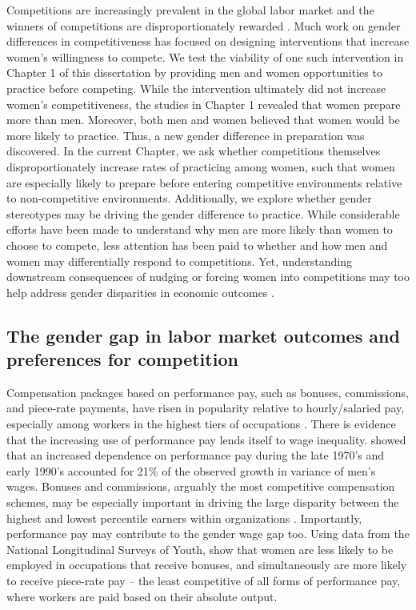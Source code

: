 \documentclass[letterpaper, nobind]{templates/ociamthesis}
\begin{document}
Competitions are increasingly prevalent in the global labor market \autocite{Lavy2004,Lemiuex2009} and the winners of competitions are disproportionately rewarded \autocite{Frank2010}. Much work on gender differences in competitiveness has focused on designing interventions that increase women's willingness to compete. We test the viability of one such intervention in Chapter 1 of this dissertation by providing men and women opportunities to practice before competing. While the intervention ultimately did not increase women's competitiveness, the studies in Chapter 1 revealed that women prepare more than men. Moreover, both men and women believed that women would be more likely to practice. Thus, a new gender difference in preparation was discovered. In the current Chapter, we ask whether competitions themselves disproportionately increase rates of practicing among women, such that women are especially likely to prepare before entering competitive environments relative to non-competitive environments. Additionally, we explore whether gender stereotypes may be driving the gender difference to practice. While considerable efforts have been made to understand why men are more likely than women to choose to compete, less attention has been paid to whether and how men and women may differentially respond to competitions. Yet, understanding downstream consequences of nudging or forcing women into competitions may too help address gender disparities in economic outcomes \autocite{Blau2017,Altonji1999}.

\hypertarget{the-gender-gap-in-labor-market-outcomes-and-preferences-for-competition}{%
\subsection{The gender gap in labor market outcomes and preferences for competition}\label{the-gender-gap-in-labor-market-outcomes-and-preferences-for-competition}}

Compensation packages based on performance pay, such as bonuses, commissions, and piece-rate payments, have risen in popularity relative to hourly/salaried pay, especially among workers in the highest tiers of occupations \autocite{Hall1998,Murphy1999,Cunat2005,Lemiuex2009}. There is evidence that the increasing use of performance pay lends itself to wage inequality. \textcite{Lemiuex2009} showed that an increased dependence on performance pay during the late 1970's and early 1990's accounted for 21\% of the observed growth in variance of men's wages. Bonuses and commissions, arguably the most competitive compensation schemes, may be especially important in driving the large disparity between the highest and lowest percentile earners within organizations \autocite{Bell2010,Bell2014,Benabou2016}. Importantly, performance pay may contribute to the gender wage gap too. Using data from the National Longitudinal Surveys of Youth, \textcite{McGee2015} show that women are less likely to be employed in occupations that receive bonuses, and simultaneously are more likely to receive piece-rate pay -- the least competitive of all forms of performance pay, where workers are paid based on their absolute output.
\end{document}
